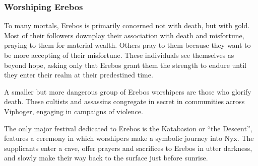     \subsubsection{Worshiping Erebos}
        To many mortals, Erebos is primarily concerned not with death, but with gold.
        Most of their followers downplay their association with death and misfortune, praying to them for material wealth.
        Others pray to them because they want to be more accepting of their misfortune.
        These individuals see themselves as beyond hope, asking only that Erebos grant them the strength to endure until they enter their realm at their predestined time.

        A smaller but more dangerous group of Erebos worshipers are those who glorify death.
        These cultists and assassins congregate in secret in communities across Viphoger, engaging in campaigns of violence.

        The only major festival dedicated to Erebos is the Katabasion or ``the Descent'', features a ceremony in which worshipers make a symbolic journey into Nyx.
        The supplicants enter a cave, offer prayers and sacrifices to Erebos in utter darkness, and slowly make their way back to the surface just before sunrise.
